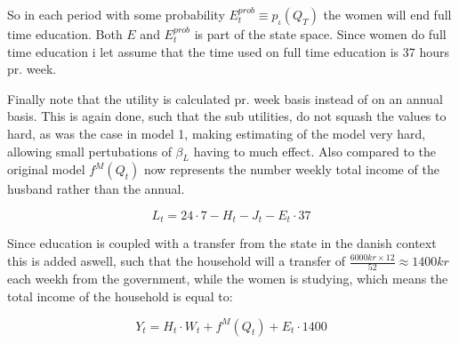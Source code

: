 So in each period with some probability $E^{prob}_t \equiv p_{\iota}(Q_T)$ the women will end full time education. Both $E$ and $E^{prob}_t$ is part of the state space. Since women do full time education i let assume that the time used on full time education is 37 hours pr. week.

Finally note that the utility is calculated pr. week basis instead of on an annual basis. This is again done, such that the sub utilities, do not squash the values to hard, as was the case in model 1, making estimating of the model very hard, allowing small pertubations of $\beta_L$ having to much effect. Also compared to the original model $f^M(Q_t)$ now represents the number weekly total income of the husband rather than the annual.

\begin{equation}
    L_t = 24 \cdot 7 - H_t - J_t - E_t \cdot 37
\end{equation}

Since education is coupled with a transfer from the state in the danish context this is added aswell, such that the household will a transfer of $\frac{6000 kr \times 12}{52} \approx 1400 kr$ each weekh from the government, while the women is studying, which means the total income of the household is equal to:

\begin{equation}
    Y_t = H_t \cdot W_t + f^M(Q_t) + E_t \cdot 1400
\end{equation}


